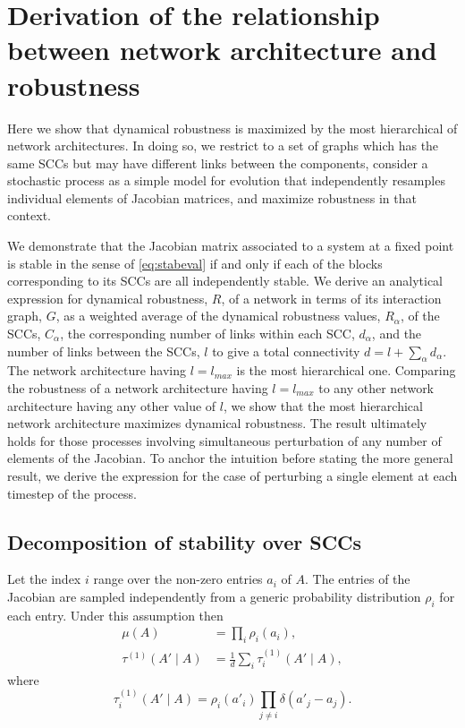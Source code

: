 \section{Derivation of the relationship between network architecture and robustness}
Here we show that dynamical robustness is maximized by the most hierarchical of network architectures. In doing so, we restrict to a set of graphs which has the same SCCs but may have different links between the components, consider a stochastic process as a simple model for evolution that independently resamples individual elements of Jacobian matrices, and maximize robustness in that context.

We demonstrate that the Jacobian matrix associated to a system at a fixed point is stable in the sense of \ref{eq:stabeval} if and only if each of the blocks corresponding to its SCCs are all independently stable. We derive an analytical expression for dynamical robustness, $R$, of a network in terms of its interaction graph, $G$, as a weighted average of the dynamical robustness values, $R_{\alpha}$, of the SCCs, $C_{\alpha}$, the corresponding number of links within each SCC, $d_{\alpha}$, and the number of links between the SCCs, $l$ to give a total connectivity $d = l + \sum_{\alpha} d_{\alpha}$. The network architecture having $l=l_{max}$ is the most hierarchical one. Comparing the robustness of a network architecture having $l = l_{max}$ to any other network architecture having any other value of $l$, we show that the most hierarchical network architecture maximizes dynamical robustness. The result ultimately holds for those processes involving simultaneous perturbation of any number of elements of the Jacobian. To anchor the intuition before stating the more general result, we derive the expression for the case of perturbing a single element at each timestep of the process.
\subsection{Decomposition of stability over SCCs}
Let the index $i$ range over the non-zero entries $a_i$ of $A$. The entries of the Jacobian are sampled independently from a generic probability distribution $\rho_i$ for each entry. Under this assumption then
\begin{equation}\label{eq:singleresamplemutau}
\begin{aligned}
\mu(A) &= \prod_i \rho_i(a_i),\\
\tau^{(1)}(A' \mid A) &= \frac{1}{d} \sum_i \tau^{(1)}_i (A' \mid A),
\end{aligned}
\end{equation}
where
$$
\tau^{(1)}_i(A' \mid A) = \rho_i(a'_i) \prod_{j \neq i} \delta(a'_j - a_j).
$$

